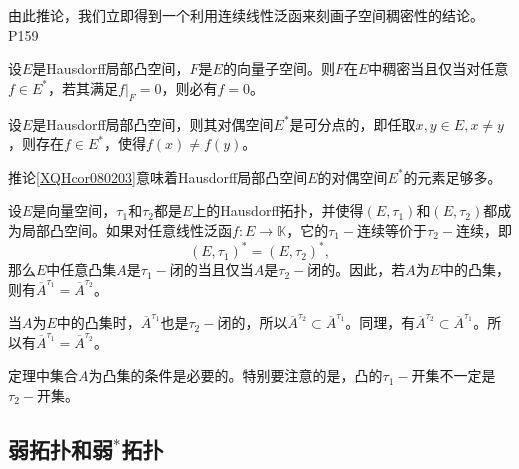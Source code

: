 \original
{
	由此推论，我们立即得到一个利用连续线性泛函来刻画子空间稠密性的结论。
}
{P159}

\begin{corollary}
设$E$是Hausdorff局部凸空间，$F$是$E$的向量子空间。则$F$在$E$中稠密当且仅当对任意$f\in E^{*}$，若其满足$f\big|_{F}=0$，则必有$f=0$。
\end{corollary}


\begin{corollary}\label{XQHcor080203}
	设$E$是Hausdorff局部凸空间，则其对偶空间$E^{*}$是可分点的，即任取$x,y\in E,x\neq y$，则存在$f\in E^{*}$，使得$f(x)\neq f(y)$。
\end{corollary}

\begin{remark}
	推论\ref{XQHcor080203}意味着Hausdorff局部凸空间$E$的对偶空间$E^{*}$的元素足够多。
\end{remark}

\begin{corollary}[Mazur 定理]
	设$E$是向量空间，$\tau_{1}$和$\tau_{2}$都是$E$上的Hausdorff拓扑，并使得$(E,\tau_{1})$和$(E,\tau_{2})$都成为局部凸空间。如果对任意线性泛函$f:E\rightarrow\mathbb{K}$，它的$\tau_{1}-$连续等价于$\tau_{2}-$连续，即
	\begin{equation*}
		(E,\tau_{1})^{*}=(E,\tau_{2})^{*},
	\end{equation*}
	那么$E$中任意凸集$A$是$\tau_{1}-$闭的当且仅当$A$是$\tau_{2}-$闭的。因此，若$A$为$E$中的凸集，则有$\overline{A}^{\tau_{1}}=\overline{A}^{\tau_{2}}$。
\end{corollary}

\begin{remark}
	当$A$为$E$中的凸集时，$\overline{A}^{\tau_{1}}$也是$\tau_{2}-$闭的，所以$\overline{A}^{\tau_{2}}\subset \overline{A}^{\tau_{1}}$。同理，有$\overline{A}^{\tau_{2}}\subset\overline{A}^{\tau_{1}}$。所以有$\overline{A}^{\tau_{1}}=\overline{A}^{\tau_{2}}$。
\end{remark}

\begin{remark}
	定理中集合$A$为凸集的条件是必要的。特别要注意的是，凸的$\tau_{1}-$开集不一定是$\tau_{2}-$开集。
\end{remark}




\subsection{弱拓扑和弱$\!\!^{*}\!\!$拓扑}











